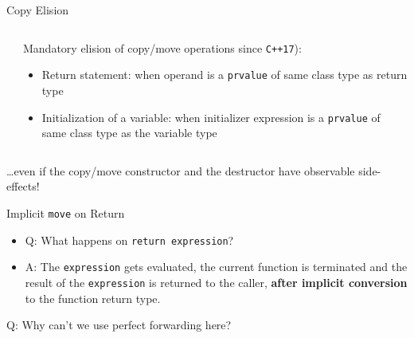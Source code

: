 \documentclass[compress,aspectratio=1610]{beamer}
\newcommand{\inputcpplisting}[1]{}
\begin{document}
\begin{frame}{Copy Elision}
    \begin{columns}
        \begin{column}{.45\textwidth}
            \inputcpplisting{snippet10}
        \end{column}
        \begin{column}{.5\textwidth}
            Mandatory elision of copy/move operations since \texttt{C++17}):
            \begin{itemize}
                \item Return statement: when operand is a \texttt{prvalue} of same class type as return type
                \item Initialization of a variable: when initializer expression is a \texttt{prvalue} of same class type as the variable type
            \end{itemize}
        \end{column}
    \end{columns}
    \ldots even if the copy/move constructor and the destructor have observable side-effects!
    \vspace{.5cm}

    \centering
\end{frame}

\begin{frame}{Implicit \texttt{move} on Return}
    \begin{itemize}
        \item Q: What happens on \texttt{return expression}?
        \item A: The \texttt{expression} gets evaluated, the current function is terminated and the result of the \texttt{expression} is returned to the caller, \textbf{after implicit conversion} to the function return type.
    \end{itemize}
\end{frame}

\begin{frame}[fragile]{Q: Why can't we use perfect forwarding here?}
    \inputcpplisting{snippet9}

\end{frame}
\end{document}
